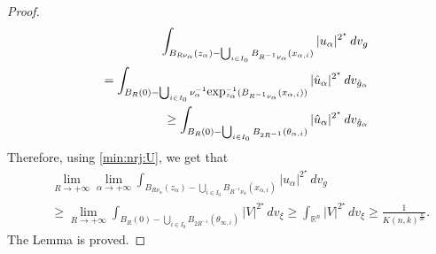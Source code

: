 \documentclass[reqno]{amsart}
\def \rn {\mathbb{R}^n}
\def \crit {2^\star}
\def \ua {u_\alpha}
\def \na {\nu_\alpha}
\def \za {z_\alpha}
\def \xai {x_{\alpha,i}}
\begin{document}
\begin{proof}
\begin{eqnarray*}
&&\int_{B_{R\na}(\za)-\bigcup_{i\in I_0}B_{R^{-1}\na}(\xai)}|\ua|^{\crit}\, dv_g\\
&&=\int_{B_{R}(0)-\bigcup_{i\in I_0}\na^{-1}\hbox{exp}_{\za}^{-1}(B_{R^{-1}\na}(\xai))}|\hat{u}_\alpha|^{\crit}\, dv_{\hat{g}_\alpha}\\
&&\geq \int_{B_{R}(0)-\bigcup_{i\in I_0} B_{2R^{-1} }(\theta_{\alpha, i})}|\hat{u}_\alpha|^{\crit}\, dv_{\hat{g}_\alpha}
\end{eqnarray*}
Therefore, using  \eqref{min:nrj:U}, we get that
\begin{eqnarray*}
&&\lim_{R\to +\infty}\lim_{\alpha\to +\infty}\int_{B_{R\na}(\za)-\bigcup_{i\in I_0}B_{R^{-1}\na}(\xai)}|\ua|^{\crit}\, dv_g\\
&&\geq \lim_{R\to +\infty}\int_{B_{R}(0)-\bigcup_{i\in I_0} B_{2R^{-1} }(\theta_{\infty, i})}|V|^{\crit}\, dv_{\xi}\geq \int_{\rn}|V|^{\crit}\, dv_{\xi}\geq \frac{1}{K(n,k)^{\frac{n}{2k}}}.
\end{eqnarray*}
The Lemma is proved.\end{proof}
\end{document}
